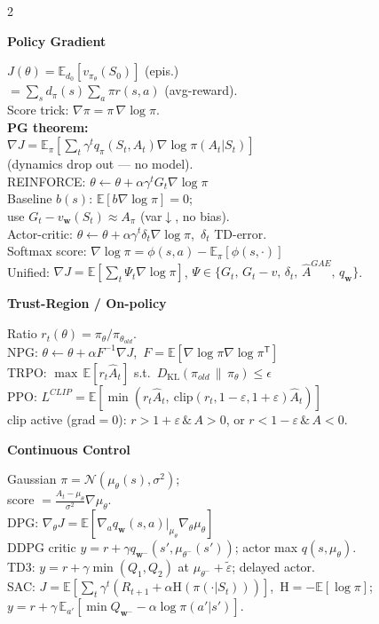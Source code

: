 \documentclass[a4paper]{article}
\newcommand{\hd}[1]{%
  \par\addvspace{3.6pt}%
  {\color{accent}\bfseries\small #1}\par
  \vspace{-4pt}{\color{accent!45}\rule{\linewidth}{0.4pt}}\par\vspace{1.2pt}}
\newcommand{\E}{\mathbb{E}}
\newcommand{\KL}[2]{D_{\mathrm{KL}}(#1\,\|\,#2)}
\newcommand{\grad}{\nabla}
\newcommand{\T}{^{\mathsf{T}}}
\newcommand{\Normal}{\mathcal{N}}
\newcommand{\Ent}{\mathrm{H}}
\begin{document}
\begin{multicols}{2}
\hd{Policy Gradient}
$J(\theta)=\E_{d_0}[v_{\pi_\theta}(S_0)]$ (epis.)\\
$=\sum_s d_\pi(s)\sum_a\pi r(s,a)$ (avg-reward).\\
Score trick: $\grad\pi=\pi\,\grad\log\pi$.\\
\textbf{PG theorem:}\\
$\grad J=\E_\pi[\sum_t\gamma^t q_\pi(S_t,A_t)\grad\log\pi(A_t|S_t)]$\\
(dynamics drop out — no model).\\
REINFORCE: $\theta\!\leftarrow\!\theta+\alpha\gamma^t G_t\grad\log\pi$\\
Baseline $b(s)$: $\E[b\grad\log\pi]=0$;\\
use $G_t-v_\mathbf{w}(S_t)\approx A_\pi$ (var$\downarrow$, no bias).\\
Actor-critic: $\theta\!\leftarrow\!\theta+\alpha\gamma^t\delta_t\grad\log\pi$,\, $\delta_t$ TD-error.\\
Softmax score: $\grad\log\pi=\phi(s,a)-\E_\pi[\phi(s,\cdot)]$\\
Unified: $\grad J=\E[\sum_t\Psi_t\grad\log\pi]$, $\Psi\in\{G_t,\,G_t{-}v,\,\delta_t,\,\hat A^{GAE},\,q_\mathbf{w}\}$.

\hd{Trust-Region / On-policy}
Ratio $r_t(\theta)=\pi_\theta/\pi_{\theta_{old}}$.\\
NPG: $\theta\!\leftarrow\!\theta+\alpha F^{-1}\grad J$,\ $F{=}\E[\grad\log\pi\grad\log\pi\T]$\\
TRPO: $\max\,\E[r_t\hat A_t]$ s.t.\ $\KL{\pi_{old}}{\pi_\theta}\le\epsilon$\\
PPO: $L^{CLIP}=\E[\min(r_t\hat A_t,\ \mathrm{clip}(r_t,1{-}\varepsilon,1{+}\varepsilon)\hat A_t)]$\\
clip active (grad${=}0$): $r{>}1{+}\varepsilon\,\&\,A{>}0$, or $r{<}1{-}\varepsilon\,\&\,A{<}0$.

\hd{Continuous Control}
Gaussian $\pi=\Normal(\mu_\theta(s),\sigma^2)$;\\
score $=\frac{A_t-\mu_\theta}{\sigma^2}\grad\mu_\theta$.\\
DPG: $\grad_\theta J=\E[\grad_a q_\mathbf{w}(s,a)|_{\mu_\theta}\grad_\theta\mu_\theta]$\\
DDPG critic $y=r+\gamma q_{\mathbf{w}^-}(s',\mu_{\theta^-}(s'))$; actor max $q(s,\mu_\theta)$.\\
TD3: $y=r+\gamma\min(Q_1,Q_2)$ at $\mu_{\theta^-}+\tilde\varepsilon$; delayed actor.\\
SAC: $J=\E[\sum_t\gamma^t(R_{t+1}+\alpha\Ent(\pi(\cdot|S_t)))]$,\ $\Ent=-\E[\log\pi]$;\\
$y=r+\gamma\,\E_{a'}[\min Q_{\mathbf{w}^-}-\alpha\log\pi(a'|s')]$.


\end{multicols}
\end{document}
